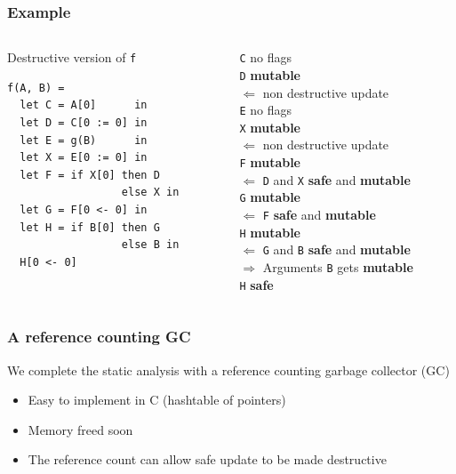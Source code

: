 \documentclass{beamer}
\newcommand{\cl}[1]{\texttt{#1}}
\begin{document}
\begin{frame}[fragile]
\frametitle{Example}
\begin{columns}
\begin{column}{0.5\textwidth}
Destructive version of \cl{f}
\begin{lstlisting}
f(A, B) =
  let C = A[0]      in
  let D = C[0 := 0] in
  let E = g(B)      in
  let X = E[0 := 0] in
  let F = if X[0] then D
                  else X in
  let G = F[0 <- 0] in
  let H = if B[0] then G
                  else B in
  H[0 <- 0]
\end{lstlisting}
\end{column}
\begin{column}{0.5\textwidth}
\pause
\cl{C} no flags \\
\pause
\cl{D} \textbf{ mutable }\\
$\Longleftarrow$ non destructive update\\
\pause
\cl{E} no flags \\
\pause
\cl{X} \textbf{ mutable }\\
$\Longleftarrow$ non destructive update\\
\pause
\cl{F} \textbf{ mutable } \\
$\Longleftarrow$ \cl{D} and \cl{X} \textbf{safe} and \textbf{mutable}\\
\pause
\cl{G} \textbf{ mutable } \\
$\Longleftarrow$ \cl{F} \textbf{safe} and \textbf{mutable}\\
\pause
\cl{H} \textbf{ mutable } \\
$\Longleftarrow$ \cl{G} and \cl{B} \textbf{safe} and \textbf{mutable}\\
\pause
$\Longrightarrow$ Arguments \cl{B} gets \textbf{mutable} \\
\pause
\cl{H} \textbf{safe}
\end{column}
\end{columns}
\end{frame}

\begin{frame}
\frametitle{A reference counting GC}
We complete the static analysis with a reference counting garbage collector (GC)
\begin{itemize}
\itemsep1em
\item Easy to implement in C (hashtable of pointers)
\item Memory freed soon
\item The reference count can allow safe update to be made destructive
\end{itemize}
\end{frame}
\end{document}
